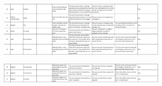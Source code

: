 \documentclass{cmpstyle}
\begin{document}
\begin{figure}[htb]
	\centering
	\includegraphics[width=0.75\textwidth]{Testing5.png}
\end{figure}
\begin{figure}[htb]
	\centering
	\includegraphics[width=0.75\textwidth]{Testing6.png}
\end{figure}
\end{document}
